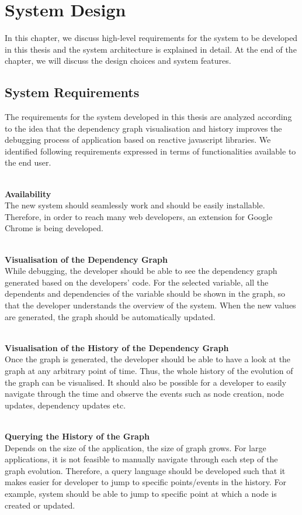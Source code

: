 \chapter{System Design} \label{chap:System Design}
In this chapter, we discuss high-level requirements for the system to be developed in this thesis and the system architecture is explained in detail. 
At the end of the chapter, we will discuss the design choices and system features.

\section{System Requirements}
The requirements for the system developed in this thesis are analyzed according to the idea that the dependency graph visualisation and history improves the debugging process of application based on reactive javascript libraries. We identified following requirements expressed in terms of functionalities available to the end user.

\leavevmode
\\
\textbf{Availability}
\\
The new system should seamlessly work and should be easily installable. Therefore, in order to reach many web developers, an extension for Google Chrome is being developed. 

\leavevmode
\\
\textbf{Visualisation of the Dependency Graph}
\\
While debugging, the developer should be able to see the dependency graph generated based on the developers' code. For the selected variable, all the dependents and dependencies of the variable should be shown in the graph, so that the developer understands the overview of the system. 
When the new values are generated, the graph should be automatically updated.

\leavevmode
\\
\textbf{Visualisation of the History of the Dependency Graph}
\\
Once the graph is generated, the developer should be able to have a look at the graph at any arbitrary point of time. Thus, the whole history of the evolution of the graph can be visualised. It should also be possible for a developer to easily navigate through the time and observe the events such as node creation, node updates, dependency updates etc.

\leavevmode
\\
\textbf{Querying the History of the Graph}
\\
Depends on the size of the application, the size of graph grows. For large applications, it is not feasible to manually navigate through each step of the graph evolution. Therefore, a query language should be developed such that it makes easier for developer to jump to specific points/events in the history. For example, system should be able to jump to specific point at which a node is created or updated.

